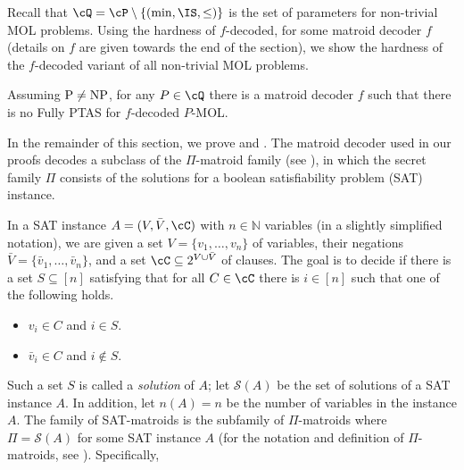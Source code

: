 	Recall that $\cQ = \cP \setminus \{(\min,\IS,\leq)\}$ is the set of parameters for non-trivial MOL problems. Using the hardness of $f$-decoded, for some matroid decoder $f$ (details on $f$ are given towards the end of the section), we show the hardness of the $f$-decoded  variant of all non-trivial MOL problems.
	
	

	 \begin{theorem}
	 	\label{thm:mainA}
	 	Assuming $\textnormal{P} \neq \textnormal{NP}$, for any $P \in \cQ$ there is a matroid decoder $f$ such that there is no \textnormal{Fully PTAS} for $f$-\textnormal{decoded} $P$-\textnormal{MOL}. 
	 \end{theorem}
	 
	 In the remainder of this section, we prove  and  . The matroid decoder used in our proofs decodes a subclass of the $\Pi$-matroid family (see ), in which the secret family $\Pi$ consists of the solutions for a  {\sc boolean satisfiability problem (SAT)} instance. 
	
	
	In a SAT instance $A = (V,\bar{V},\cC)$ with $n \in \mathbb{N}$ variables (in a slightly simplified notation), we are given a set $V = \{v_1, \ldots,v_n\}$ of variables, their negations $\bar{V} = \{\bar{v}_1,\ldots, \bar{v}_n\}$, and a set $\cC \subseteq 2^{V \cup \bar{V}}$ of clauses. 
	The goal is to decide if there is a set $S \subseteq [n]$ %
	satisfying that for all $C \in \cC$ there is $i \in [n]$ such that one of the following holds.   \begin{itemize}
		\item $v_i \in C$ and $i \in S$.
		\item $\bar{v}_i \in C$ and $i \notin S$. 
	\end{itemize} Such a set $S$ is called a {\em solution} of $A$; let $\mathcal{S}(A)$ be the set of solutions of a SAT instance $A$. In addition, let $n(A) = n$ be the number of variables in the instance $A$. 
	The family of SAT-matroids is the subfamily of $\Pi$-matroids where $\Pi = \mathcal{S}(A)$ for some SAT instance $A$ (for the notation and definition of $\Pi$-matroids, see ). Specifically, 
	
